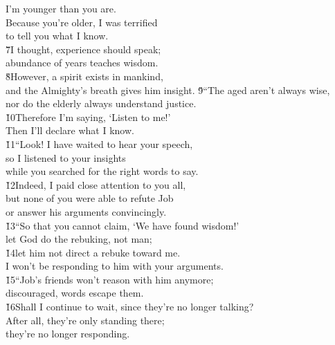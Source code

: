 \begin{poetry}
\poeml I'm younger than you are. \\
\poemll    Because you're older, I was terrified \\
\poemlll       to tell you what I know. \\
\poeml \v{7}I thought, experience should speak; \\
\poemll    abundance of years teaches wisdom. \\
\poeml \v{8}However, a spirit exists in mankind, \\
\poemll    and the Almighty's breath gives him insight.
\poeml \v{9}``The aged aren't always wise, \\
\poemll    nor do the elderly always understand justice. \\
\poeml \v{10}Therefore I'm saying, `Listen to me!' \\
\poemll    Then I'll declare what I know. \\
\poeml \v{11}``Look! I have waited to hear your speech, \\
\poemll    so I listened to your insights \\
\poemlll       while you searched for the right words to say. \\
\poeml \v{12}Indeed, I paid close attention to you all, \\
\poemll    but none of you were able to refute Job \\
\poemlll       or answer his arguments convincingly. \\
\poeml \v{13}``So that you cannot claim, `We have found wisdom!' \\
\poemll    let God do the rebuking, not man; \\
\poeml \v{14}let him not direct a rebuke toward me. \\
\poemll    I won't be responding to him with your arguments. \\
\poeml \v{15}``Job's friends won't reason with him anymore; \\
\poemll    discouraged, words escape them. \\
\poeml \v{16}Shall I continue to wait, since they're no longer talking? \\
\poemll    After all, they're only standing there; \\
\poemlll       they're no longer responding. \\

\end{poetry}
